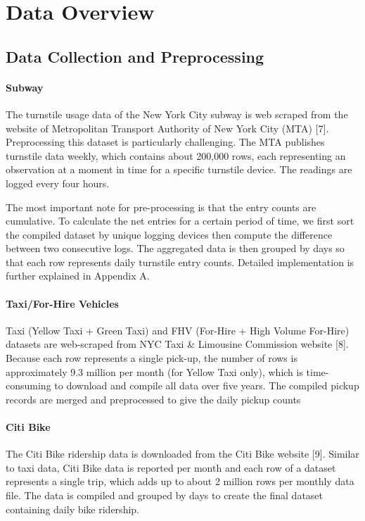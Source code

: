 \documentclass{article}
\begin{document}
\section{Data Overview}
\subsection{Data Collection and Preprocessing}

\paragraph{Subway}
The turnstile usage data of the New York City subway is web scraped from the website of Metropolitan Transport Authority of New York City (MTA) [7]. Preprocessing this dataset is particularly challenging. The MTA publishes turnstile data weekly, which contains about 200,000 rows, each representing an observation at a moment in time for a specific turnstile device. The readings are logged every four hours. 

The most important note for pre-processing is that the entry counts are cumulative. To calculate the net entries for a certain period of time, we first sort the compiled dataset by unique logging devices then compute the difference between two consecutive logs. The aggregated data is then grouped by days so that each row represents daily turnstile entry counts. Detailed implementation is further explained in Appendix A. 

\paragraph{Taxi/For-Hire Vehicles}

Taxi (Yellow Taxi + Green Taxi) and FHV (For-Hire + High Volume For-Hire) datasets are web-scraped from NYC Taxi & Limousine Commission website [8]. Because each row represents a single pick-up, the number of rows is approximately 9.3 million per month (for Yellow Taxi only), which is time-consuming to download and compile all data over five years. The compiled pickup records are merged and preprocessed to give the daily pickup counts

\paragraph{Citi Bike}

The Citi Bike ridership data is downloaded from the Citi Bike website [9]. Similar to taxi data, Citi Bike data is reported per month and each row of a dataset represents a single trip, which adds up to about 2 million rows per monthly data file. The data is compiled and grouped by days to create the final dataset containing daily bike ridership. 
\end{document}

